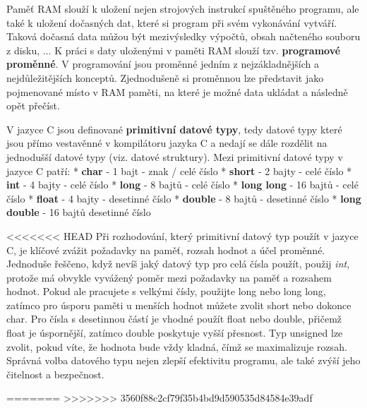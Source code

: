 Paměť RAM slouží k uložení nejen strojových instrukcí spuštěného programu, ale také k uložení dočasných dat, které si program při svém vykonávání vytváří. Taková dočasná data můžou být mezivýsledky výpočtů, obsah načteného souboru z disku, ... K práci s daty uloženými v paměti RAM slouží tzv. {\bf programové proměnné}. V programování jsou proměnné jedním z nejzákladnějších a nejdůležitějších konceptů. Zjednodušeně si proměnnou lze představit jako pojmenované místo v RAM paměti, na které je možné data ukládat a následně opět přečíst. 




V jazyce C jsou definované {\bf primitivní datové typy}, tedy datové typy které jsou přímo vestavěnné v kompilátoru jazyka C a nedají se dále rozdělit na jednodušší datové typy (viz. datové struktury). Mezi primitivní datové typy v jazyce C patří:
\begitems
* {\bf char} - 1 bajt - znak / celé číslo
* {\bf short} - 2 bajty - celé číslo
* {\bf int} - 4 bajty - celé číslo
* {\bf long} - 8 bajtů - celé číslo
* {\bf long long} - 16 bajtů - celé číslo 
* {\bf float} - 4 bajty - desetinné číslo
* {\bf double} - 8 bajtů - desetinné číslo
* {\bf long double} - 16 bajtů desetinné číslo  
\enditems

<<<<<<< HEAD
Při rozhodování, který primitivní datový typ použít v jazyce C, je klíčové zvážit požadavky na paměť, rozsah hodnot a účel proměnné. Jednoduše řeščeno, když nevíš jaký datový typ pro celá čísla použít, použij {\it int}, protože má obvykle vyvážený poměr mezi požadavky na paměť a rozsahem hodnot. Pokud ale pracujete s velkými čísly, použijte long nebo long long, zatímco pro úsporu paměti u menších hodnot můžete zvolit short nebo dokonce char. Pro čísla s desetinnou částí je vhodné použít float nebo double, přičemž float je úspornější, zatímco double poskytuje vyšší přesnost. Typ unsigned lze zvolit, pokud víte, že hodnota bude vždy kladná, čímž se maximalizuje rozsah. Správná volba datového typu nejen zlepší efektivitu programu, ale také zvýší jeho čitelnost a bezpečnost.

=======
>>>>>>> 3560f88c2cf79f35b4bd9d590535d84584e39adf



